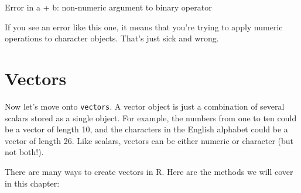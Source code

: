 \documentclass[]{book}
\theoremstyle{definition}
\theoremstyle{definition}
\theoremstyle{remark}
\begin{document}
Error in a + b: non-numeric argument to binary operator

If you see an error like this one, it means that you're trying to apply
numeric operations to character objects. That's just sick and wrong.

\section{Vectors}\label{vectors}

Now let's move onto \texttt{vectors}. A vector object is just a
combination of several scalars stored as a single object. For example,
the numbers from one to ten could be a vector of length 10, and the
characters in the English alphabet could be a vector of length 26. Like
scalars, vectors can be either numeric or character (but not both!).

There are many ways to create vectors in R. Here are the methods we will
cover in this chapter:
\end{document}

